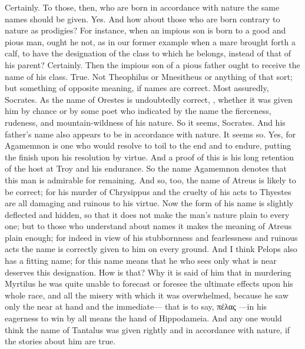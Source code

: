 \hermogenesspeaks
Certainly.
\socratesspeaks
To those, then, who are born in accordance with nature the same names should be given.
\hermogenesspeaks
Yes.
\socratesspeaks
And how about those who are born contrary to nature as prodigies? For instance, when an impious son is born to a good and pious man, ought he not, as in our former example when a mare brought forth a calf, to have the designation of the class to which he belongs, instead of that of his parent?
\hermogenesspeaks
Certainly. 
\socratesspeaks
Then the impious son of a pious father ought to receive the name of his class.
\hermogenesspeaks
True.
\socratesspeaks
Not Theophilus  or Mnesitheus  or anything of that sort; but something of opposite meaning, if names are correct.
\hermogenesspeaks
Most assuredly, Socrates.
\socratesspeaks
As the name of Orestes  is undoubtedly correct, \hermogenesspeaks, whether it was given him by chance or by some poet who indicated by the name the fierceness, rudeness, and mountain-wildness of his nature. 
\hermogenesspeaks
So it seems, Socrates.
\socratesspeaks
And his father's name also appears to be in accordance with nature.
\hermogenesspeaks
It seems so.
\socratesspeaks
Yes, for Agamemnon  is one who would resolve to toil to the end and to endure, putting the finish upon his resolution by virtue. And a proof of this is his long retention of the host at Troy and his endurance. So the name Agamemnon denotes that this man is admirable for remaining.  And so, too, the name of Atreus is likely to be correct; for his murder of Chrysippus and the cruelty of his acts to Thyestes are all damaging and ruinous  to his virtue. Now the form of his name is slightly deflected and hidden, so that it does not make the man's nature plain to every one; but to those who understand about names it makes the meaning of Atreus plain enough; for indeed  in view of his stubbornness  and fearlessness  and ruinous acts  the name is correctly given to him on every ground. And I think Pelops also has a fitting name; for this name means that he who sees only what is near deserves this designation.
\hermogenesspeaks
How is that?
\socratesspeaks
Why it is said of him that in murdering Myrtilus he was quite unable to forecast or foresee the ultimate effects upon his whole race, and all the misery with which it was overwhelmed,  because he saw only the near at hand and the immediate— that is to say, πέλας —in his eagerness to win by all means the hand of Hippodameia. And any one would think the name of Tantalus was given rightly and in accordance with nature, if the stories about him are true.
